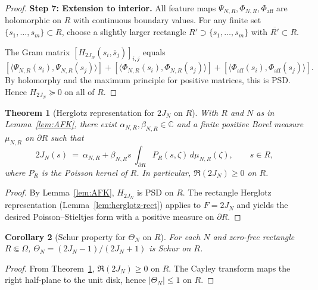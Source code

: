 \documentclass[11pt]{article}
\newtheorem{theorem}{Theorem}
\newtheorem{corollary}[theorem]{Corollary}
\theoremstyle{remark}
\begin{document}
\begin{proof}
\medskip
\noindent\textbf{Step 7: Extension to interior.}
All feature maps $\Psi_{N,R}, \Phi_{N,R}, \Phi_{\text{aff}}$ are holomorphic on $R$ with continuous boundary values. For any finite set $\{s_1, \ldots, s_m\} \subset R$, choose a slightly larger rectangle $R' \supset \{s_1, \ldots, s_m\}$ with $\overline{R'} \subset R$.

The Gram matrix $[H_{2J_N}(s_i, \bar s_j)]_{i,j}$ equals
\[
  [\langle \Psi_{N,R}(s_i), \Psi_{N,R}(s_j) \rangle] + [\langle \Phi_{N,R}(s_i), \Phi_{N,R}(s_j) \rangle] + [\langle \Phi_{\text{aff}}(s_i), \Phi_{\text{aff}}(s_j) \rangle].
\]
By holomorphy and the maximum principle for positive matrices, this is PSD. Hence $H_{2J_N} \succeq 0$ on all of $R$.
\end{proof}

\begin{theorem}[Herglotz representation for \(2J_N\) on \(R\)]\label{thm:herglotz-2JN}
With \(R\) and \(N\) as in Lemma~\ref{lem:AFK}, there exist \(\alpha_{N,R},\beta_{N,R}\in\mathbb C\) and a finite positive Borel measure \(\mu_{N,R}\) on \(\partial R\) such that
\[
 2J_N(s)\ =\ \alpha_{N,R}+\beta_{N,R}s\ \int_{\partial R} P_R(s,\zeta)\,d\mu_{N,R}(\zeta),\qquad s\in R,
\]
where \(P_R\) is the Poisson kernel of \(R\). In particular, \(\Re(2J_N)\ge 0\) on \(R\).
\end{theorem}
\begin{proof}
By Lemma~\ref{lem:AFK}, \(H_{2J_N}\) is PSD on \(R\). The rectangle Herglotz representation (Lemma~\ref{lem:herglotz-rect}) applies to \(F=2J_N\) and yields the desired Poisson–Stieltjes form with a positive measure on \(\partial R\).
\end{proof}

\begin{corollary}[Schur property for \(\Theta_N\) on \(R\)]\label{cor:ThetaN-Schur-R}
For each \(N\) and zero-free rectangle \(R\Subset\Omega\), \(\Theta_N=(2J_N-1)/(2J_N+1)\) is Schur on \(R\).
\end{corollary}
\begin{proof}
From Theorem~\ref{thm:herglotz-2JN}, \(\Re(2J_N)\ge 0\) on \(R\). The Cayley transform maps the right half-plane to the unit disk, hence \(|\Theta_N|\le 1\) on \(R\).
\end{proof}
\end{document}
